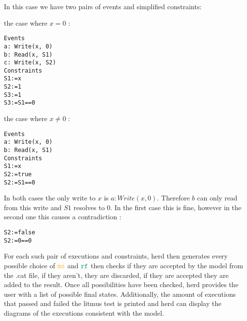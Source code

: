 \documentclass[a4,11pt,dvipsnames]{article}
\begin{document}
In this case we have two pairs of events and simplified constraints:
\begin{itemize}
\item the case where $x = 0$ :\begin{lstlisting}
Events
a: Write(x, 0)
b: Read(x, S1)
c: Write(x, S2)
Constraints
S1:=x
S2:=1
S3:=1
S3:=S1==0
\end{lstlisting}

\begin{minipage}{\textwidth}
\item the case where $x \neq 0$ : \begin{lstlisting}
Events
a: Write(x, 0)
b: Read(x, S1)
Constraints
S1:=x
S2:=true
S2:=S1==0
\end{lstlisting}
\end{minipage}
\end{itemize}


In both cases the only write to $x$ is $a: Write(x, 0)$. Therefore $b$ can only read from this write and $S1$ resolves to 0. In the first case this is fine, however in the second one this causes a contradiction :
\begin{lstlisting}
S2:=false
S2:=0==0
\end{lstlisting}



 For each such pair of executions and constraints, herd then generates every possible choice of $\mo$ and $\rf$ then checks if they are accepted by the model from the .cat file, if they aren't, they are discarded, if they are accepted they are added to the result. Once all possibilities have been checked, herd provides the user with a list of possible final states. Additionally, the amount of executions that passed and failed the litmus test is printed and herd can display the diagrams of the executions consistent with the model.


\end{document}
